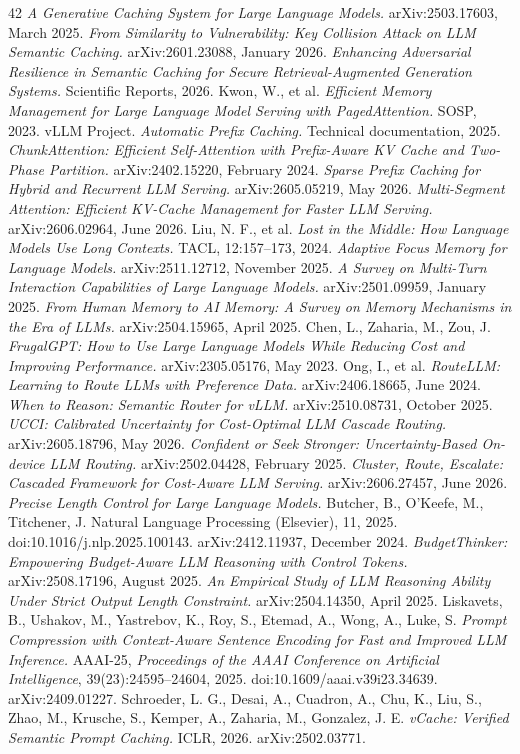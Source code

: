 \documentclass[11pt,a4paper]{article}
\begin{document}
\begin{thebibliography}{42}
 \emph{A Generative Caching System for Large Language Models.} arXiv:2503.17603, March 2025.
 \emph{From Similarity to Vulnerability: Key Collision Attack on LLM Semantic Caching.} arXiv:2601.23088, January 2026.
 \emph{Enhancing Adversarial Resilience in Semantic Caching for Secure Retrieval-Augmented Generation Systems.} Scientific Reports, 2026.
 Kwon, W., et al. \emph{Efficient Memory Management for Large Language Model Serving with PagedAttention.} SOSP, 2023.
 vLLM Project. \emph{Automatic Prefix Caching.} Technical documentation, 2025.
 \emph{ChunkAttention: Efficient Self-Attention with Prefix-Aware KV Cache and Two-Phase Partition.} arXiv:2402.15220, February 2024.
 \emph{Sparse Prefix Caching for Hybrid and Recurrent LLM Serving.} arXiv:2605.05219, May 2026.
 \emph{Multi-Segment Attention: Efficient KV-Cache Management for Faster LLM Serving.} arXiv:2606.02964, June 2026.
 Liu, N. F., et al. \emph{Lost in the Middle: How Language Models Use Long Contexts.} TACL, 12:157--173, 2024.
 \emph{Adaptive Focus Memory for Language Models.} arXiv:2511.12712, November 2025.
 \emph{A Survey on Multi-Turn Interaction Capabilities of Large Language Models.} arXiv:2501.09959, January 2025.
 \emph{From Human Memory to AI Memory: A Survey on Memory Mechanisms in the Era of LLMs.} arXiv:2504.15965, April 2025.
 Chen, L., Zaharia, M., Zou, J. \emph{FrugalGPT: How to Use Large Language Models While Reducing Cost and Improving Performance.} arXiv:2305.05176, May 2023.
 Ong, I., et al. \emph{RouteLLM: Learning to Route LLMs with Preference Data.} arXiv:2406.18665, June 2024.
 \emph{When to Reason: Semantic Router for vLLM.} arXiv:2510.08731, October 2025.
 \emph{UCCI: Calibrated Uncertainty for Cost-Optimal LLM Cascade Routing.} arXiv:2605.18796, May 2026.
 \emph{Confident or Seek Stronger: Uncertainty-Based On-device LLM Routing.} arXiv:2502.04428, February 2025.
 \emph{Cluster, Route, Escalate: Cascaded Framework for Cost-Aware LLM Serving.} arXiv:2606.27457, June 2026.
 \emph{Precise Length Control for Large Language Models.} Butcher, B., O'Keefe, M., Titchener, J. Natural Language Processing (Elsevier), 11, 2025. doi:10.1016/j.nlp.2025.100143. arXiv:2412.11937, December 2024.
 \emph{BudgetThinker: Empowering Budget-Aware LLM Reasoning with Control Tokens.} arXiv:2508.17196, August 2025.
 \emph{An Empirical Study of LLM Reasoning Ability Under Strict Output Length Constraint.} arXiv:2504.14350, April 2025.
 Liskavets, B., Ushakov, M., Yastrebov, K., Roy, S., Etemad, A., Wong, A., Luke, S. \emph{Prompt Compression with Context-Aware Sentence Encoding for Fast and Improved LLM Inference.} AAAI-25, \emph{Proceedings of the AAAI Conference on Artificial Intelligence}, 39(23):24595--24604, 2025. doi:10.1609/aaai.v39i23.34639. arXiv:2409.01227.
 Schroeder, L. G., Desai, A., Cuadron, A., Chu, K., Liu, S., Zhao, M., Krusche, S., Kemper, A., Zaharia, M., Gonzalez, J. E. \emph{vCache: Verified Semantic Prompt Caching.} ICLR, 2026. arXiv:2502.03771.
\end{thebibliography}
\end{document}
